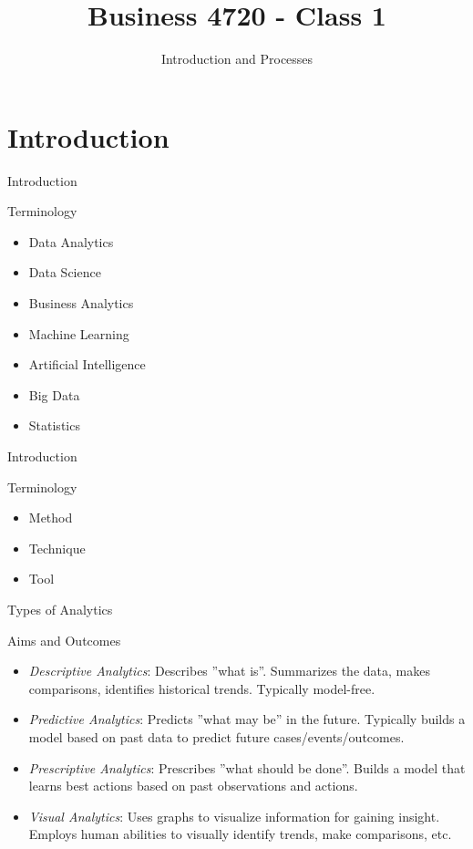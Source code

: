 \documentclass[ignorenonframetext,xcolor=dvipsnames]{beamer}
\title{Business 4720 - Class 1}
\subtitle{Introduction and Processes}
\begin{document}
\begin{frame}{}
  \titlepage
  \footnotesize
  
\end{frame}

\section{Introduction}


\begin{frame}{Introduction}
\begin{block}{Terminology}
  \begin{itemize}
    \item Data Analytics
    \item Data Science
    \item Business Analytics
    \item Machine Learning
    \item Artificial Intelligence
    \item Big Data
    \item Statistics
  \end{itemize}
\end{block}
\end{frame}

\begin{frame}{Introduction}
\begin{block}{Terminology}
  \begin{itemize}
    \item Method
    \item Technique
    \item Tool
  \end{itemize}
\end{block}
\end{frame}

\begin{frame}{Types of Analytics}
\begin{block}{Aims and Outcomes}
\begin{itemize}
	\item \emph{Descriptive Analytics}: Describes ''what is''. Summarizes the data, makes comparisons, identifies historical trends. Typically model-free.
	\item \emph{Predictive Analytics}: Predicts ''what may be'' in the future. Typically builds a model based on past data to predict future cases/events/outcomes. 
	\item \emph{Prescriptive Analytics}: Prescribes ''what should be done''. Builds a model that learns best actions based on past observations and actions. 
	\item \emph{Visual Analytics}: Uses graphs to visualize information for gaining insight. Employs human abilities to visually identify trends, make comparisons, etc. 
\end{itemize}
\end{block}
\end{frame}
\end{document}
